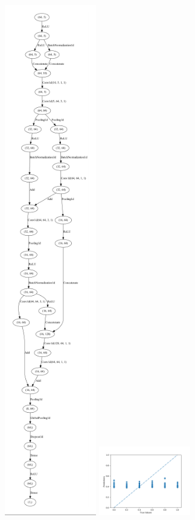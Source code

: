 \documentclass[a4paper]{report}
\begin{document}
\includegraphics[width=0.3\textwidth,height=0.3\textheight,keepaspectratio]{img/5/NAS/nas-model.png}
\includegraphics[width=0.3\textwidth,height=0.3\textheight,keepaspectratio]{img/5/NAS/predictions.png}
\end{document}
